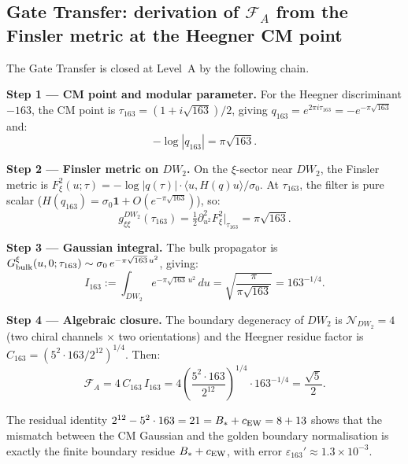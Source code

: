 \documentclass[twocolumn,10pt]{article}
\begin{document}
\subsection*{Gate Transfer: derivation of $\mathcal{F}_A$ from the
Finsler metric at the Heegner CM point}
\label{sec:gate_transfer}

The Gate Transfer is closed at Level~A by the following chain.

\medskip
\noindent\textbf{Step 1 --- CM point and modular parameter.}
For the Heegner discriminant $-163$, the CM point is
$\tau_{163}=(1+i\sqrt{163})/2$, giving
$q_{163}=e^{2\pi i\tau_{163}}=-e^{-\pi\sqrt{163}}$ and:
\begin{equation}
  -\log|q_{163}| = \pi\sqrt{163}.
  \label{eq:log_q163}
\end{equation}

\noindent\textbf{Step 2 --- Finsler metric on $DW_2$.}
On the $\xi$-sector near $DW_2$, the Finsler metric is
$F_\xi^2(u;\tau)=-\log|q(\tau)|\cdot\langle u,H(q)u\rangle/\sigma_0$.
At $\tau_{163}$, the filter is pure scalar
($H(q_{163})=\sigma_0\mathbf{1}+O(e^{-\pi\sqrt{163}})$), so:
\begin{equation}
  g^{DW_2}_{\xi\xi}(\tau_{163})
  = \tfrac{1}{2}\partial^2_{u^2}F_\xi^2\big|_{\tau_{163}}
  = \pi\sqrt{163}.
  \label{eq:finsler_hessian}
\end{equation}

\noindent\textbf{Step 3 --- Gaussian integral.}
The bulk propagator is
$G^\xi_{\rm bulk}(u,0;\tau_{163})\sim\sigma_0\,e^{-\pi\sqrt{163}\,u^2}$,
giving:
\begin{equation}
  I_{163} := \int_{DW_2} e^{-\pi\sqrt{163}\,u^2}\,du
  = \sqrt{\frac{\pi}{\pi\sqrt{163}}} = 163^{-1/4}.
  \label{eq:I163}
\end{equation}

\noindent\textbf{Step 4 --- Algebraic closure.}
The boundary degeneracy of $DW_2$ is $\mathcal{N}_{DW_2}=4$
(two chiral channels $\times$ two orientations) and the Heegner
residue factor is $C_{163}=(5^2\cdot163/2^{12})^{1/4}$.
Then:
\begin{equation}
  \boxed{
  \mathcal{F}_A = 4\,C_{163}\,I_{163}
  = 4\!\left(\frac{5^2\cdot163}{2^{12}}\right)^{\!1/4}\!\cdot163^{-1/4}
  = \frac{\sqrt{5}}{2}.
  }
  \label{eq:FA_derived}
\end{equation}

The residual identity $2^{12}-5^2\cdot163=21=B_\ast+c_{\rm EW}=8+13$
shows that the mismatch between the CM Gaussian and the golden
boundary normalisation is exactly the finite boundary residue
$B_\ast+c_{\rm EW}$, with error $\varepsilon_{163}'\approx1.3\times10^{-3}$.
\end{document}
